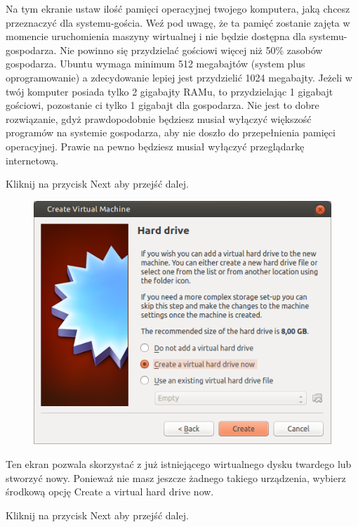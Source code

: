 Na tym ekranie ustaw ilość pamięci operacyjnej twojego komputera, jaką chcesz przeznaczyć dla systemu-gościa. Weź pod uwagę, że ta pamięć zostanie zajęta w momencie uruchomienia maszyny wirtualnej i nie będzie dostępna dla systemu-gospodarza. Nie powinno się przydzielać gościowi więcej niż 50\% zasobów gospodarza. Ubuntu wymaga minimum 512 megabajtów (system plus oprogramowanie) a zdecydowanie lepiej jest przydzielić 1024 megabajty.
Jeżeli w twój komputer posiada tylko 2 gigabajty RAMu, to przydzielając 1 gigabajt gościowi, pozostanie ci tylko 1 gigabajt dla gospodarza. Nie jest to dobre rozwiązanie, gdyż prawdopodobnie będziesz musiał wyłączyć większość programów na systemie gospodarza, aby nie doszło do przepełnienia pamięci operacyjnej. Prawie na pewno będziesz musiał wyłączyć przeglądarkę internetową.
\begin{flushright}
Kliknij na przycisk \textcolor{ubuntu_orange}{Next} aby przejść dalej.
\end{flushright}

\begin{figure}
	\vspace{-10pt}
	\includegraphics[width=\linewidth]{images/virtualbox_wizard3.png}
\end{figure}

Ten ekran pozwala skorzystać z już istniejącego wirtualnego dysku twardego lub stworzyć nowy. Ponieważ nie masz jeszcze żadnego takiego urządzenia, wybierz środkową opcję \textcolor{ubuntu_orange}{Create a virtual hard drive now}.
\begin{flushright}
Kliknij na przycisk \textcolor{ubuntu_orange}{Next} aby przejść dalej.
\end{flushright}
\clearpage

